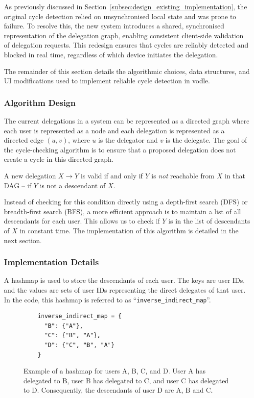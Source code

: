 As previously discussed in Section~\ref{subsec:design_existing_implementation}, the original cycle detection relied on unsynchronised local state and was prone to failure. To resolve this, the new system introduces a shared, synchronised representation of the delegation graph, enabling consistent client-side validation of delegation requests. This redesign ensures that cycles are reliably detected and blocked in real time, regardless of which device initiates the delegation.

The remainder of this section details the algorithmic choices, data structures, and UI modifications used to implement reliable cycle detection in vodle.
\subsubsection{Algorithm Design}
The current delegations in a system can be represented as a directed graph where each user is represented as a node and each delegation is represented as a directed edge $(u,v)$, where $u$ is the delegator and $v$ is the delegate. The goal of the cycle-checking algorithm is to ensure that a proposed delegation does not create a cycle in this directed graph.

A new delegation $X\to Y$ is valid if and only if $Y$ is \emph{not} reachable from $X$ in that DAG -- if $Y$ is not a descendant of $X$.

Instead of checking for this condition directly using a depth-first search (DFS) or breadth-first search (BFS), a more efficient approach is to maintain a list of all descendants for each user. This allows us to check if $Y$ is in the list of descendants of $X$ in constant time. The implementation of this algorithm is detailed in the next section.

\subsubsection{Implementation Details}
A hashmap is used to store the descendants of each user. The keys are user IDs, and the values are sets of user IDs representing the direct delegates of that user. In the code, this hashmap is referred to as ``\verb|inverse_indirect_map|''.
\begin{figure}[H]
  \centering
  \begin{verbatim}
    inverse_indirect_map = {
      "B": {"A"},
      "C": {"B", "A"},
      "D": {"C", "B", "A"}
    }
    \end{verbatim}
  \caption{Example of a hashmap for users A, B, C, and D. User A has delegated to B, user B has delegated to C, and user C has delegated to D. Consequently, the descendants of user D are A, B and C.}
  \label{fig:inverse_indirect_map}
\end{figure}

